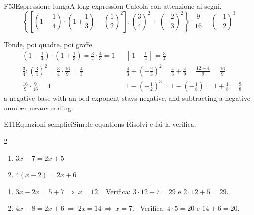 \begin{esercizio}{F5}{3}{Espressione lunga}{A long expression}
Calcola con attenzione ai segni. 
\[\left\{\left[\left(1-\frac14\right)\cdot\left(1+\frac13\right)-\left(\frac12\right)^2\right]:\left(\frac34\right)^2+\left(-\frac23\right)^2\right\}\cdot\frac{9}{16}-\left(-\frac12\right)^3\]
\end{esercizio}
\begin{solbox}
Tonde, poi quadre, poi graffe. 
\begin{align*}
&\left(1-\tfrac14\right)\cdot\left(1+\tfrac13\right)=\tfrac34\cdot\tfrac43=1
&&\left[\,1-\tfrac14\,\right]=\tfrac34\\
&\tfrac34:\left(\tfrac34\right)^2=\tfrac34\cdot\tfrac{16}{9}=\tfrac43
&&\tfrac43+\left(-\tfrac23\right)^2=\tfrac43+\tfrac49=\tfrac{12+4}{9}=\tfrac{16}{9}\\
&\tfrac{16}{9}\cdot\tfrac{9}{16}=1
&&1-\left(-\tfrac12\right)^3=1-\left(-\tfrac18\right)=1+\tfrac18=\boxed{\tfrac98}
\end{align*}
{a negative base with an odd exponent stays negative, and subtracting a negative number means adding.}
\end{solbox}


\begin{esercizio}{E1}{1}{Equazioni semplici}{Simple equations}
Risolvi e fai la verifica. 
\begin{multicols}{2}
\begin{enumerate}
\item $3x-7=2x+5$
\item $4(x-2)=2x+6$
\end{enumerate}
\end{multicols}
\end{esercizio}
\begin{solbox}
\begin{enumerate}
\item $3x-2x=5+7\ \Rightarrow\ \boxed{x=12}$. \ Verifica: $3\cdot12-7=29$ e $2\cdot12+5=29$. \checkmark
\item $4x-8=2x+6\ \Rightarrow\ 2x=14\ \Rightarrow\ \boxed{x=7}$. \ Verifica: $4\cdot5=20$ e $14+6=20$. \checkmark
\end{enumerate}
\end{solbox}

